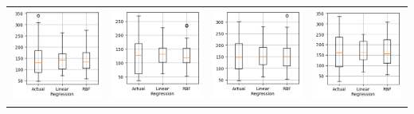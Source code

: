 \documentclass{article}
\begin{document}
\begin{center}
\begin{tabular}{cccc}
\includegraphics[scale=0.3]{result_dist_1} &
\includegraphics[scale=0.3]{result_dist_2} &
\includegraphics[scale=0.3]{result_dist_3} &
\includegraphics[scale=0.3]{result_dist_4}
\end{tabular}
\end{center}
\end{document}
